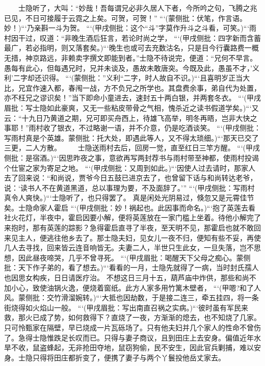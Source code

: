 \documentclass[
    ref = refDemo.bib,
    coverpage = cover.pdf,
    geometry = b5,
    lang = cn
]{spBook}
\begin{document}
    　　士隐听了，大叫：“妙哉！吾每谓兄必非久居人下者，今所吟之句，飞腾之兆已见，不日可接履于云霓之上矣。可贺，可贺！” ```(蒙侧批：伏笔，作言语。妙！)```乃亲斟一斗为贺。 ```(甲戌侧批：这个“斗”字莫作升斗之斗看，可笑。)```雨村因干过，叹道：“非晚生酒后狂言，若论时尚之学， ```(甲戌侧批：四字新而含蓄最广，若必指明，则又落套矣。)```晚生也或可去充数沽名，只是目今行囊路费一概无措，神京路远，非赖卖字撰文即能到者。”士隐不待说完，便道：“兄何不早言。愚每有此心，但每遇兄时，兄并未谈及，愚故未敢唐突。今既及此，愚虽不才，’义利’二字却还识得。 ```(蒙侧批：”义利“二字，时人故自不识。)```且喜明岁正当大比，兄宜作速入都，春闱一战，方不负兄之所学也。其盘费余事，弟自代为处置，亦不枉兄之谬识矣！”当下即命小童进去，速封五十两白银，并两套冬衣。 ```(甲戌眉批：写士隐如此豪爽，又无一些粘皮带骨之气相，愧杀近之读书假道学矣。)```又云：“十九日乃黄道之期，兄可即买舟西上，待雄飞高举，明冬再晤，岂非大快之事耶！”雨村收了银衣，不过略谢一语，并不介意，仍是吃酒谈笑。 ```(甲戌侧批：写雨村真是个英雄。蒙侧批：托大处，即遇此等人，又不得太琐细。)```那天已交了三更，二人方散。  
    　　士隐送雨村去后，回房一觉，直至红日三竿方醒。 ```(甲戌侧批：是宿酒。)```因思昨夜之事，意欲再写两封荐书与雨村带至神都，使雨村投谒个仕宦之家为寄足之地。 ```(甲戌侧批：又周到如此。)```因使人过去请时，那家人去了回来说：“和尚说，贾爷今日五鼓已进京去了，也曾留下话与和尚转达老爷，说：‘读书人不在黄道黑道，总以事理为要，不及面辞了。’” ```(甲戌侧批：写雨村真令人爽快。)```士隐听了，也只得罢了。 真是闲处光阴易过，倏忽又是元霄佳节矣。士隐命家人霍启 ```(甲戌侧批：妙！祸起也。此因事而命名。)```抱了英莲去看社火花灯，半夜中，霍启因要小解，便将英莲放在一家门槛上坐着。待他小解完了来抱时，那有英莲的踪影？急得霍启直寻了半夜，至天明不见，那霍启也就不敢回来见主人，便逃往他乡去了。那士隐夫妇，见女儿一夜不归，便知有些不妥，再使几人去寻找，回来皆云连音响皆无。夫妻二人，半世只生此女，一旦失落，岂不思想，因此昼夜啼哭，几乎不曾寻死。 ```(甲戌眉批：喝醒天下父母之痴心。蒙侧批：天下作子弟的，看了想去。)```看看的一月，士隐先就得了一病，当时封氏孺人也因思女构疾，日日请医疗治。 不想这日三月十五，葫芦庙中炸供，那些和尚不加小心，致使油锅火逸，便烧着窗纸。此方人家多用竹篱木壁者， ```(甲嗯?和了人风。蒙侧批：交竹滑溜婉转。)```大抵也因劫数，于是接二连三，牵五挂四，将一条街烧得如火焰山一般。 ```(甲戌眉批：写出南直召祸之实病。)```彼时虽有军民来救，那火已成了势，如何救得下？直烧了一夜，方渐渐的熄去，也不知烧了几家。只可怜甄家在隔壁，早已烧成一片瓦砾场了。只有他夫妇并几个家人的性命不曾伤了。急得士隐惟跌足长叹而已。只得与妻子商议，且到田庄上去安身。偏值近年水旱不收，鼠盗蜂起，无非抢田夺地，鼠窃狗偷，民不安生，因此官兵剿捕，难以安身。士隐只得将田庄都折变了，便携了妻子与两个丫鬟投他岳丈家去。  
\end{document}
